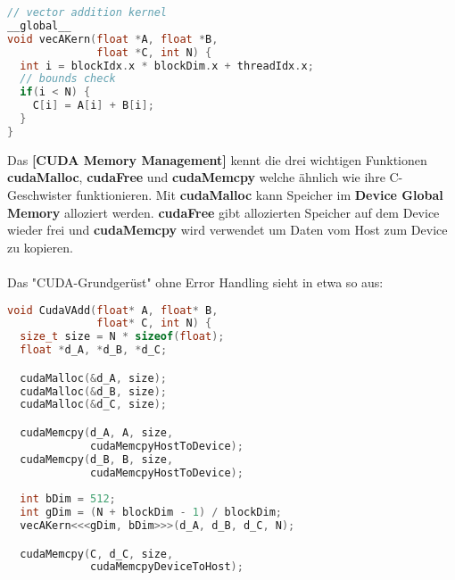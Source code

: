\documentclass[8pt]{extarticle}
\let\oldtextbf\textbf
\renewcommand{\textbf}{\tiny\oldtextbf}
\begin{document}
\begin{multicols*}{5}
\begin{lstlisting}[language=c]
// vector addition kernel
__global__
void vecAKern(float *A, float *B,
              float *C, int N) {
  int i = blockIdx.x * blockDim.x + threadIdx.x;
  // bounds check
  if(i < N) {
    C[i] = A[i] + B[i];
  }
}
\end{lstlisting}
Das \textbf{[CUDA Memory Management]} kennt die drei wichtigen Funktionen \textbf{cudaMalloc}, \textbf{cudaFree} und \textbf{cudaMemcpy} welche ähnlich wie ihre C-Geschwister funktionieren. Mit \textbf{cudaMalloc} kann Speicher im \textbf{Device Global Memory} alloziert werden. \textbf{cudaFree} gibt allozierten Speicher auf dem Device wieder frei und \textbf{cudaMemcpy} wird verwendet um Daten vom Host zum Device zu kopieren.\\\\
Das "CUDA-Grundgerüst" ohne Error Handling sieht in etwa so aus:
\begin{lstlisting}[language=c]
void CudaVAdd(float* A, float* B,
              float* C, int N) {
  size_t size = N * sizeof(float);
  float *d_A, *d_B, *d_C;

  cudaMalloc(&d_A, size);
  cudaMalloc(&d_B, size);
  cudaMalloc(&d_C, size);

  cudaMemcpy(d_A, A, size,
             cudaMemcpyHostToDevice);
  cudaMemcpy(d_B, B, size,
             cudaMemcpyHostToDevice);
  
  int bDim = 512;
  int gDim = (N + blockDim - 1) / blockDim;
  vecAKern<<<gDim, bDim>>>(d_A, d_B, d_C, N);

  cudaMemcpy(C, d_C, size,
             cudaMemcpyDeviceToHost);


\end{lstlisting}
\end{multicols*}
\end{document}
